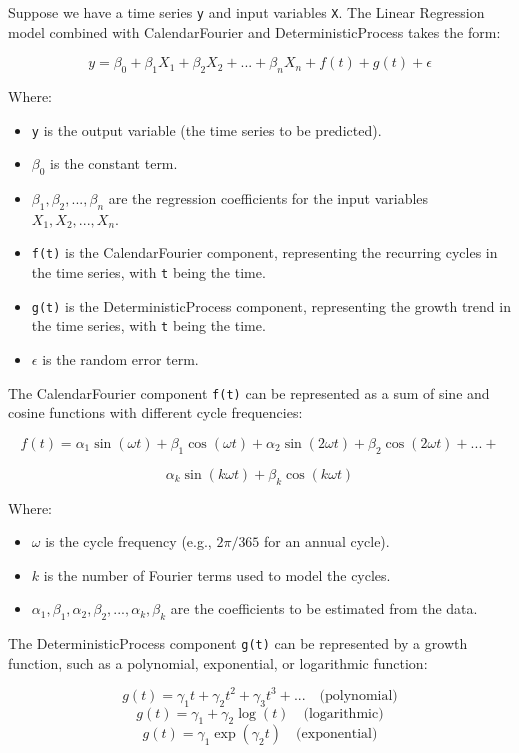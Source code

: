 \documentclass{ieeeojies}
\begin{document}
Suppose we have a time series \verb|y| and input variables \verb|X|. The Linear Regression model combined with CalendarFourier and DeterministicProcess takes the form: 

$$y = \beta_0 + \beta_1X_1 + \beta_2X_2 + ... + \beta_nX_n + f(t) + g(t) + \epsilon$$

Where:

\begin{itemize}
    \item \verb|y| is the output variable (the time series to be predicted).
    \item $\beta_0$ is the constant term.
\item $\beta_1, \beta_2, ..., \beta_n$ are the regression coefficients for the input variables $X_1, X_2, ..., X_n$.
    \item \verb|f(t)| is the CalendarFourier component, representing the recurring cycles in the time series, with \verb|t| being the time.
    \item \verb|g(t)| is the DeterministicProcess component, representing the growth trend in the time series, with \verb|t| being the time.
\item $\epsilon$ is the random error term.
\end{itemize}

 The CalendarFourier component \verb|f(t)| can be represented as a sum of sine and cosine functions with different cycle frequencies: 
 
$$f(t) = \alpha_1\sin(\omega t) + \beta_1\cos(\omega t) + \alpha_2\sin(2\omega t) + \beta_2\cos(2\omega t) + ... + $$

$$\alpha_k\sin(k\omega t) + \beta_k\cos(k\omega t)$$

 Where:

\begin{itemize}
\item $\omega$ is the cycle frequency (e.g., $2\pi/365$ for an annual cycle).
    \item $k$ is the number of Fourier terms used to model the cycles.
\item $\alpha_1, \beta_1, \alpha_2, \beta_2, ..., \alpha_k, \beta_k$ are the coefficients to be estimated from the data.
\end{itemize}


The DeterministicProcess component \verb|g(t)| can be represented by a growth function, such as a polynomial, exponential, or logarithmic function:

 $$g(t) = \gamma_1t + \gamma_2t^2 + \gamma_3t^3 + ... \quad \text{(polynomial)}$$
$$g(t) = \gamma_1 + \gamma_2\log(t) \quad \text{(logarithmic)}$$
$$g(t) = \gamma_1\exp(\gamma_2t) \quad \text{(exponential)}$$
\end{document}
